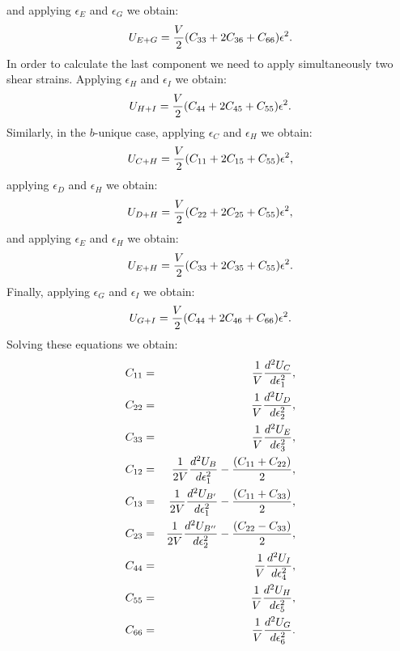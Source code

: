 \documentclass[12pt,a4paper]{article}
\begin{document}
and applying $\epsilon_E$ and $\epsilon_G$ we obtain:
\begin{equation}
U_{E+G}= {V \over 2} (C_{33}+2 C_{36} + C_{66}) \epsilon^2.
\end{equation}
In order to calculate the last component we need to apply
simultaneously two shear strains. 
Applying $\epsilon_H$ and $\epsilon_I$ we obtain:
\begin{equation}
U_{H+I}= {V \over 2} (C_{44}+2 C_{45} + C_{55}) \epsilon^2.
\end{equation}
Similarly, in the $b$-unique case, applying $\epsilon_C$ and 
$\epsilon_H$ we obtain:
\begin{equation}
U_{C+H}= {V \over 2} (C_{11}+2 C_{15} + C_{55}) \epsilon^2,
\end{equation}
applying $\epsilon_D$ and $\epsilon_H$ we obtain:
\begin{equation}
U_{D+H}= {V \over 2} (C_{22}+2 C_{25} + C_{55}) \epsilon^2,
\end{equation}
and applying $\epsilon_E$ and $\epsilon_H$ we obtain:
\begin{equation}
U_{E+H}= {V \over 2} (C_{33}+2 C_{35} + C_{55}) \epsilon^2.
\end{equation}
Finally, applying $\epsilon_G$ and $\epsilon_I$ we obtain:
\begin{equation}
U_{G+I}= {V \over 2} (C_{44}+2 C_{46} + C_{66}) \epsilon^2.
\end{equation}
Solving these equations we obtain:
\begin{eqnarray}
C_{11}&=&{1 \over V} {d^2 U_C \over d \epsilon_1^2}, \\ 
C_{22}&=&{1 \over V} {d^2 U_D \over d \epsilon_2^2}, \\ 
C_{33}&=&{1 \over V} {d^2 U_E \over d \epsilon_3^2}, \\ 
C_{12}&=&{1 \over 2 V} {d^2 U_B \over d \epsilon_1^2} - 
                             {(C_{11}+ C_{22})\over 2}, \\
C_{13}&=&{1 \over 2 V} {d^2 U_{B'} \over d \epsilon_1^2} - 
                             {(C_{11} + C_{33})\over 2}, \\
C_{23}&=&{1 \over 2 V} {d^2 U_{B''} \over d \epsilon_2^2} - 
                             {(C_{22} - C_{33})\over 2}, \\
C_{44}&=&{1 \over V} {d^2 U_I \over d \epsilon_4^2}, \\
C_{55}&=&{1 \over V} {d^2 U_H \over d \epsilon_5^2}, \\
C_{66}&=&{1 \over V} {d^2 U_G \over d \epsilon_6^2}.
\end{eqnarray}
\end{document}
